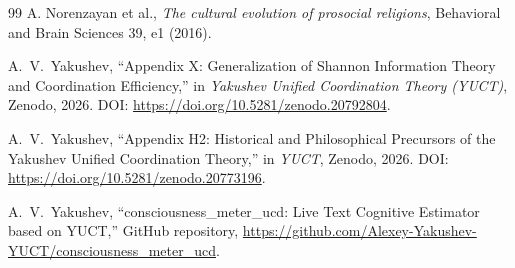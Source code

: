 \documentclass[12pt,a4paper]{article}
\begin{document}
\begin{thebibliography}{99}
		A. Norenzayan et al., \emph{The cultural evolution of prosocial religions}, Behavioral and Brain Sciences 39, e1 (2016).
		
		A.~V.~Yakushev, ``Appendix X: Generalization of Shannon Information Theory and Coordination Efficiency,'' in \emph{Yakushev Unified Coordination Theory (YUCT)}, Zenodo, 2026. DOI: \url{https://doi.org/10.5281/zenodo.20792804}.
		
		A.~V.~Yakushev, ``Appendix H2: Historical and Philosophical Precursors of the Yakushev Unified Coordination Theory,'' in \emph{YUCT}, Zenodo, 2026. DOI: \url{https://doi.org/10.5281/zenodo.20773196}.
		
		A.~V.~Yakushev, ``consciousness\_meter\_ucd: Live Text Cognitive Estimator based on YUCT,'' GitHub repository, \url{https://github.com/Alexey-Yakushev-YUCT/consciousness_meter_ucd}.
		
	\end{thebibliography}
	
\end{document}
